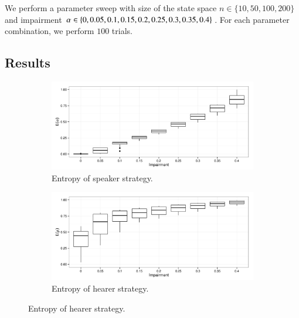We perform a parameter sweep with size of the state space $n \in \{10, 50, 100, 200\}$ and impairment $\alpha \in \{0, 0.05, 0.1, 0.15, 0.2, 0.25, 0.3, 0.35, 0.4\}$.
For each parameter combination, we perform $100$ trials.

\subsection{Results}

\begin{figure}
        \centering
        \begin{subfigure}{0.45\textwidth}
                \includegraphics[width=\textwidth]{plots/Speaker-entropy-20140121-141158}
                \caption{Entropy of speaker strategy.}
        \end{subfigure}%
        \begin{subfigure}{0.45\textwidth}
                \includegraphics[width=\textwidth]{plots/Hearer-entropy-20140121-141158}
                \caption{Entropy of hearer strategy.}
        \end{subfigure}


\end{figure}
